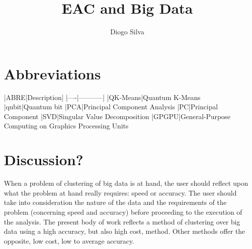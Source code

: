 \documentclass[10pt,a4paper,final]{article}
\author{Diogo Silva}
\title{EAC and Big Data}
\begin{document}
\onehalfspacing %

\section{Abbreviations}

|ABRE|Description|
|----|-----------|
|QK-Means|Quantum K-Means
|qubit|Quantum bit
|PCA|Principal Component Analysis
|PC|Principal Component
|SVD|Singular Value Decomposition
|GPGPU|General-Purpose Computing on Graphics Processing Units



\tableofcontents













\section{Discussion?}

When a problem of clustering of big data is at hand, the user should reflect upon what the problem at hand really requires: speed or accuracy. The user should take into consideration the nature of the data and the requirements of the problem (concerning speed and accuracy) before proceeding to the execution of the analysis. The present body of work reflects a method of clustering over big data using a high accuracy, but also high cost, method. Other methods offer the opposite, low cost, low to average accuracy. 



\end{document}
